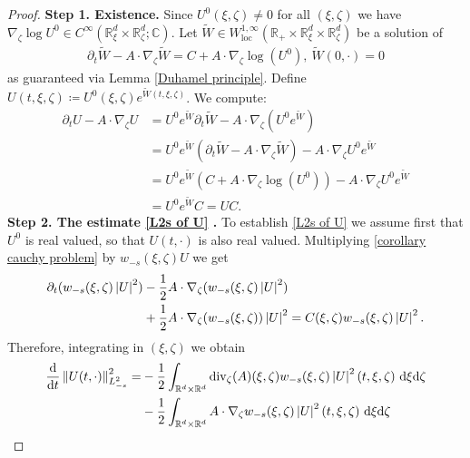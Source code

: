 \documentclass[11pt,reqno]{amsart}
\numberwithin{equation}{section}
\def\dd{{\rm d}}
\begin{document}
\begin{proof}
\textbf{Step 1. Existence.} Since $U^
{0}(\xi,\zeta)\neq 0$ for all $(\xi,\zeta)$ we have $\nabla_{\zeta}\log U^{0}\in C^{\infty}(\mathbb{R}^{d}_{\xi}\times \mathbb{R}^{d}_{\zeta};\mathbb{C})$. Let $\widetilde{W}\in W^{1,\infty}_{\mathrm{loc}}(\mathbb{R}_{+}\times \mathbb{R}^{d}_{\xi}\times \mathbb{R}^{d}_{\zeta})$ be a solution of 
\begin{align*}
\partial_{t}\widetilde{W}-A\cdot \nabla_{\zeta}\widetilde{W}=C+A\cdot\nabla_{\zeta}\log(U^{0}), \ \widetilde{W}(0,\cdot)=0      
\end{align*}
as guaranteed via Lemma \ref{Duhamel principle}.  
Define  $U(t,\xi,\zeta)\coloneqq U^{0}(\xi,\zeta)e^{\widetilde{W}(t,\xi,\zeta)}$. We compute: 
\begin{align*}
\partial_{t}U-A\cdot\nabla_{\zeta}U&=U^{0}e^{\widetilde{W}}\partial_{t}\widetilde{W}-A\cdot \nabla_{\zeta}(U^{0}e^{\widetilde{W}})\\
&=U^{0}e^{\widetilde{W}}\left(\partial_{t}\widetilde{W}-A\cdot \nabla_{\zeta}\widetilde{W}\right)-A\cdot \nabla_{\zeta}U^{0}e^{\widetilde{W}}\\
&= U^{0}e^{\widetilde{W}}(C+A\cdot\nabla_{\zeta}\log(U^{0}))-A\cdot \nabla_{\zeta}U^{0}e^{\widetilde{W}}\\
&=U^{0}e^{\widetilde{W}}C=UC. 
\end{align*}
\textbf{Step 2. The estimate \eqref{L2s of U} .} 
To establish \eqref{L2s of U}  we assume first that $U^{0}$ is real valued, so that $U(t,\cdot)$ is also real valued. 
Multiplying \eqref{corollary cauchy problem} by $w_{-s}(\xi,\zeta)U$ we get 
\begin{align}
\partial_{t}(w_{-s}(\xi,\zeta)\left\vert U\right\vert^{2})&-\frac{1}{2}A\cdot \nabla_{\zeta}(w_{-s}(\xi,\zeta)\left\vert U\right\vert^
{2}) \notag\\
&+\frac{1}{2}A\cdot\nabla_{\zeta}(w_{-s}(\xi,\zeta))\left\vert U\right\vert^{2}=C(\xi,\zeta)w_{-s}(\xi,\zeta)\left\vert U\right\vert^{2}.\label{eq for weighted U2}       
\end{align}
Therefore, integrating in $(\xi,\zeta)$ we obtain 
\begin{align*}
\frac{\dd}{\dd t}\left\Vert U(t,\cdot)\right\Vert_{L^{2}_{-s}}^{2} =&-\frac{1}{2}\int_{\mathbb{R}^{d}\times \mathbb{R}^{d}}\mathrm{div}_{\zeta}(A)(\xi,\zeta)w_{-s}(\xi,\zeta)\left\vert U\right\vert^{2}(t,\xi,\zeta)\ \dd \xi\dd \zeta\\
&-\frac{1}{2}\int_{\mathbb{R}^{d}\times \mathbb{R}^{d}}A\cdot \nabla_{\zeta}w_{-s}(\xi,\zeta)\left\vert U \right\vert^{2}(t,\xi,\zeta) \ \dd \xi \dd \zeta

\end{align*}
\end{proof}
\end{document}
